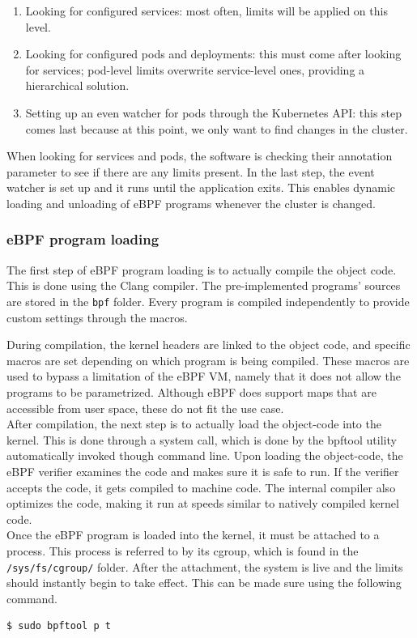 \begin{enumerate}
	\item Looking for configured services: most often, limits will be applied on this level.
	\item Looking for configured pods and deployments: this must come after looking for services; pod-level limits overwrite service-level ones, providing a hierarchical solution.
	\item Setting up an even watcher for pods through the Kubernetes API: this step comes last because at this point, we only want to find changes in the cluster.
\end{enumerate}

When looking for services and pods, the software is checking their annotation parameter to see if there are any limits present. In the last step, the event watcher is set up and it runs until the application exits. This enables dynamic loading and unloading of eBPF programs whenever the cluster is changed.

\subsubsection{eBPF program loading}
The first step of eBPF program loading is to actually compile the object code. This is done using the Clang compiler. The pre-implemented programs' sources are stored in the \texttt{bpf} folder. Every program is compiled independently to provide custom settings through the macros.

During compilation, the kernel headers are linked to the object code, and specific macros are set depending on which program is being compiled. These macros are used to bypass a limitation of the eBPF VM, namely that it does not allow the programs to be parametrized. Although eBPF does support maps that are accessible from user space, these do not fit the use case. \\

After compilation, the next step is to actually load the object-code into the kernel. This is done through a system call, which is done by the bpftool utility automatically invoked though command line. Upon loading the object-code, the eBPF verifier examines the code and makes sure it is safe to run. If the verifier accepts the code, it gets compiled to machine code. The internal compiler also optimizes the code, making it run at speeds similar to natively compiled kernel code. \\

Once the eBPF program is loaded into the kernel, it must be attached to a process. This process is referred to by its cgroup, which is found in the \texttt{/sys/fs/cgroup/} folder. After the attachment, the system is live and the limits should instantly begin to take effect. This can be made sure using the following command.
\begin{verbatim}
$ sudo bpftool p t
\end{verbatim}

